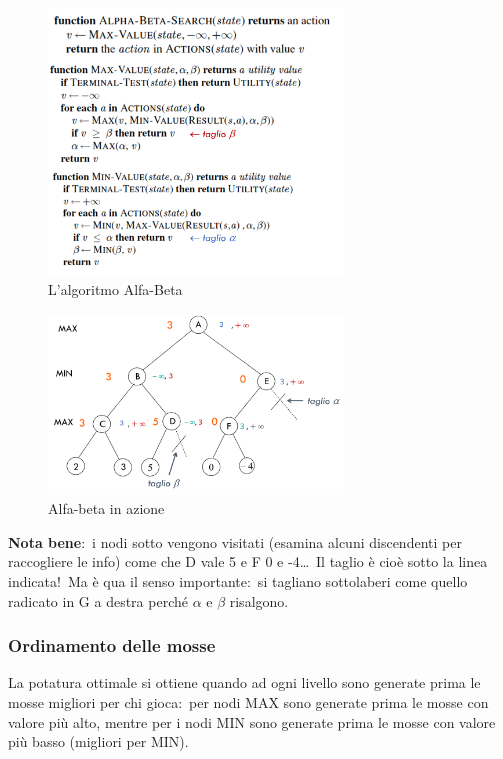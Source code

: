 \begin{figure}[H]
	\centering
	\caption*{L'algoritmo Alfa-Beta}
	\includegraphics[width=0.7\textwidth]{immagini/AlfaBeta_alg.png}
\end{figure}

\begin{figure}[H]
	\centering
	\caption*{Alfa-beta in azione}
	\includegraphics[width=0.7\textwidth]{immagini/alfaBeta_azione.jpg.png}
\end{figure}

\noindent \textbf{Nota bene}:\ i nodi sotto vengono visitati (esamina alcuni discendenti per raccogliere le info) come che D vale 5 e F 0 e -4\dots\
Il taglio è cioè sotto la linea indicata!\
Ma è qua il senso importante:\ si tagliano sottolaberi come quello radicato in G a destra perché $\alpha$ e $\beta$ risalgono.

\subsubsection{Ordinamento delle mosse}

La potatura ottimale si ottiene quando ad ogni livello sono generate prima le mosse migliori per chi gioca:\ per nodi MAX sono generate prima le mosse con valore più alto, mentre per i nodi MIN sono generate prima le mosse con valore più basso (migliori per MIN).

